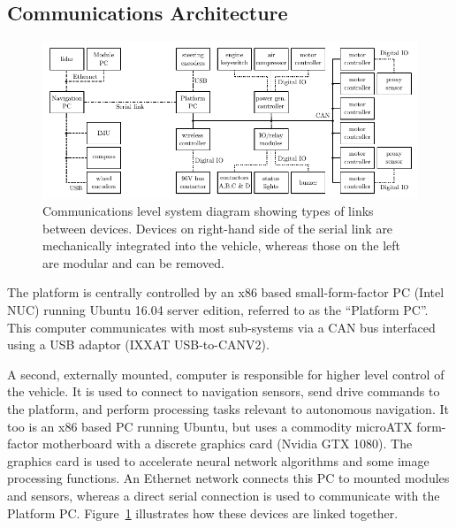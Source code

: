 \documentclass[preprint,authoryear,12pt]{elsarticle}
\begin{document}
    \subsection{Communications Architecture}
    \label{sect:architecture}

        \begin{figure}[htb]
            \centering
            \includegraphics[width=\linewidth]{imgs/system_diagram/diagram_v5.pdf}
            \caption{
                Communications level system diagram showing types of links between devices.
                Devices on right-hand side of the serial link are mechanically integrated into the vehicle, whereas those on the left are modular and can be removed.
            }
            \label{fig:system_diagram}
        \end{figure}

        The platform is centrally controlled by an x86 based small-form-factor PC (Intel NUC) running Ubuntu 16.04 server edition, referred to as the ``Platform PC''.
        This computer communicates with most sub-systems via a CAN bus interfaced using a USB adaptor (IXXAT USB-to-CANV2).

        A second, externally mounted, computer is responsible for higher level control of the vehicle.
        It is used to connect to navigation sensors, send drive commands to the platform, and perform processing tasks relevant to autonomous navigation.
        It too is an x86 based PC running Ubuntu, but uses a commodity microATX form-factor motherboard with a discrete graphics card (Nvidia GTX 1080).
        The graphics card is used to accelerate neural network algorithms and some image processing functions.
        An Ethernet network connects this PC to mounted modules and sensors, whereas a direct serial connection is used to communicate with the Platform PC.
        Figure~\ref{fig:system_diagram} illustrates how these devices are linked together.
\end{document}
